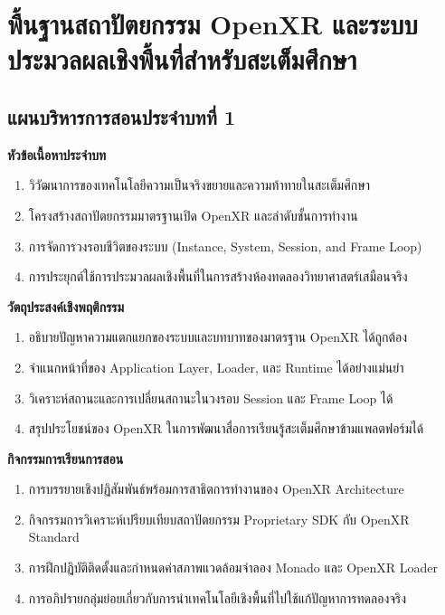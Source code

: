 \chapter{พื้นฐานสถาปัตยกรรม OpenXR และระบบประมวลผลเชิงพื้นที่สำหรับสะเต็มศึกษา}
\label{chap:ch01}

\section*{แผนบริหารการสอนประจำบทที่ 1}

\noindent\textbf{หัวข้อเนื้อหาประจำบท}
\begin{enumerate}
    \item วิวัฒนาการของเทคโนโลยีความเป็นจริงขยายและความท้าทายในสะเต็มศึกษา
    \item โครงสร้างสถาปัตยกรรมมาตรฐานเปิด OpenXR และลำดับชั้นการทำงาน
    \item การจัดการวงรอบชีวิตของระบบ (Instance, System, Session, and Frame Loop)
    \item การประยุกต์ใช้การประมวลผลเชิงพื้นที่ในการสร้างห้องทดลองวิทยาศาสตร์เสมือนจริง
\end{enumerate}

\noindent\textbf{วัตถุประสงค์เชิงพฤติกรรม}
\begin{enumerate}
    \item อธิบายปัญหาความแตกแยกของระบบและบทบาทของมาตรฐาน OpenXR ได้ถูกต้อง
    \item จำแนกหน้าที่ของ Application Layer, Loader, และ Runtime ได้อย่างแม่นยำ
    \item วิเคราะห์สถานะและการเปลี่ยนสถานะในวงรอบ Session และ Frame Loop ได้
    \item สรุปประโยชน์ของ OpenXR ในการพัฒนาสื่อการเรียนรู้สะเต็มศึกษาข้ามแพลตฟอร์มได้
\end{enumerate}

\noindent\textbf{กิจกรรมการเรียนการสอน}
\begin{enumerate}
    \item การบรรยายเชิงปฏิสัมพันธ์พร้อมการสาธิตการทำงานของ OpenXR Architecture
    \item กิจกรรมการวิเคราะห์เปรียบเทียบสถาปัตยกรรม Proprietary SDK กับ OpenXR Standard
    \item การฝึกปฏิบัติติดตั้งและกำหนดค่าสภาพแวดล้อมจำลอง Monado และ OpenXR Loader
    \item การอภิปรายกลุ่มย่อยเกี่ยวกับการนำเทคโนโลยีเชิงพื้นที่ไปใช้แก้ปัญหาการทดลองจริง
\end{enumerate}

